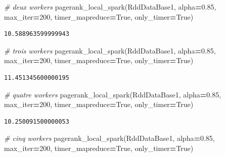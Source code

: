 \documentclass[10pt,a4paper]{article}
\newenvironment{Shaded}{\begin{snugshade}}{\end{snugshade}}
\newcommand{\CommentTok}[1]{\textcolor[rgb]{0.56,0.35,0.01}{\textit{#1}}}
\newcommand{\DecValTok}[1]{\textcolor[rgb]{0.00,0.00,0.81}{#1}}
\newcommand{\FloatTok}[1]{\textcolor[rgb]{0.00,0.00,0.81}{#1}}
\newcommand{\NormalTok}[1]{#1}
\newcommand{\OperatorTok}[1]{\textcolor[rgb]{0.81,0.36,0.00}{\textbf{#1}}}
\newcommand{\VariableTok}[1]{\textcolor[rgb]{0.00,0.00,0.00}{#1}}
\theoremstyle{break}
\begin{document}
\begin{Shaded}
\begin{Highlighting}[]
\CommentTok{# deux workers}
\NormalTok{pagerank_local_spark(RddDataBase1, alpha}\OperatorTok{=}\FloatTok{0.85}\NormalTok{, max_iter}\OperatorTok{=}\DecValTok{200}\NormalTok{,}
\NormalTok{                     timer_mapreduce}\OperatorTok{=}\VariableTok{True}\NormalTok{, only_timer}\OperatorTok{=}\VariableTok{True}\NormalTok{)}
\end{Highlighting}
\end{Shaded}

\begin{verbatim}
10.588963599999943
\end{verbatim}

\begin{Shaded}
\begin{Highlighting}[]
\CommentTok{# trois workers}
\NormalTok{pagerank_local_spark(RddDataBase1, alpha}\OperatorTok{=}\FloatTok{0.85}\NormalTok{, max_iter}\OperatorTok{=}\DecValTok{200}\NormalTok{,}
\NormalTok{                     timer_mapreduce}\OperatorTok{=}\VariableTok{True}\NormalTok{, only_timer}\OperatorTok{=}\VariableTok{True}\NormalTok{)}
\end{Highlighting}
\end{Shaded}

\begin{verbatim}
11.451345600000195
\end{verbatim}

\begin{Shaded}
\begin{Highlighting}[]
\CommentTok{# quatre workers}
\NormalTok{pagerank_local_spark(RddDataBase1, alpha}\OperatorTok{=}\FloatTok{0.85}\NormalTok{, max_iter}\OperatorTok{=}\DecValTok{200}\NormalTok{,}
\NormalTok{                     timer_mapreduce}\OperatorTok{=}\VariableTok{True}\NormalTok{, only_timer}\OperatorTok{=}\VariableTok{True}\NormalTok{)}
\end{Highlighting}
\end{Shaded}

\begin{verbatim}
10.250091500000053
\end{verbatim}

\begin{Shaded}
\begin{Highlighting}[]
\CommentTok{# cinq workers}
\NormalTok{pagerank_local_spark(RddDataBase1, alpha}\OperatorTok{=}\FloatTok{0.85}\NormalTok{, max_iter}\OperatorTok{=}\DecValTok{200}\NormalTok{,}
\NormalTok{                     timer_mapreduce}\OperatorTok{=}\VariableTok{True}\NormalTok{, only_timer}\OperatorTok{=}\VariableTok{True}\NormalTok{)}
\end{Highlighting}
\end{Shaded}
\end{document}
